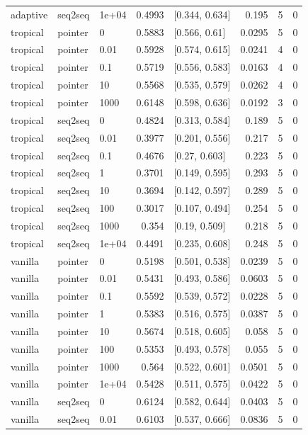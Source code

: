 \documentclass[10pt]{article}
\begin{document}
{\begin{longtable}{lllrlrrr}
adaptive & seq2seq & 1e+04 & 0.4993 & [0.344, 0.634] & 0.195 & 5 & 0\\
tropical & pointer & 0 & 0.5883 & [0.566, 0.61] & 0.0295 & 5 & 0\\
tropical & pointer & 0.01 & 0.5928 & [0.574, 0.615] & 0.0241 & 4 & 0\\
tropical & pointer & 0.1 & 0.5719 & [0.556, 0.583] & 0.0163 & 4 & 0\\
tropical & pointer & 10 & 0.5568 & [0.535, 0.579] & 0.0262 & 4 & 0\\
tropical & pointer & 1000 & 0.6148 & [0.598, 0.636] & 0.0192 & 3 & 0\\
tropical & seq2seq & 0 & 0.4824 & [0.313, 0.584] & 0.189 & 5 & 0\\
tropical & seq2seq & 0.01 & 0.3977 & [0.201, 0.556] & 0.217 & 5 & 0\\
tropical & seq2seq & 0.1 & 0.4676 & [0.27, 0.603] & 0.223 & 5 & 0\\
tropical & seq2seq & 1 & 0.3701 & [0.149, 0.595] & 0.293 & 5 & 0\\
tropical & seq2seq & 10 & 0.3694 & [0.142, 0.597] & 0.289 & 5 & 0\\
tropical & seq2seq & 100 & 0.3017 & [0.107, 0.494] & 0.254 & 5 & 0\\
tropical & seq2seq & 1000 & 0.354 & [0.19, 0.509] & 0.218 & 5 & 0\\
tropical & seq2seq & 1e+04 & 0.4491 & [0.235, 0.608] & 0.248 & 5 & 0\\
vanilla & pointer & 0 & 0.5198 & [0.501, 0.538] & 0.0239 & 5 & 0\\
vanilla & pointer & 0.01 & 0.5431 & [0.493, 0.586] & 0.0603 & 5 & 0\\
vanilla & pointer & 0.1 & 0.5592 & [0.539, 0.572] & 0.0228 & 5 & 0\\
vanilla & pointer & 1 & 0.5383 & [0.516, 0.575] & 0.0387 & 5 & 0\\
vanilla & pointer & 10 & 0.5674 & [0.518, 0.605] & 0.058 & 5 & 0\\
vanilla & pointer & 100 & 0.5353 & [0.493, 0.578] & 0.055 & 5 & 0\\
vanilla & pointer & 1000 & 0.564 & [0.522, 0.601] & 0.0501 & 5 & 0\\
vanilla & pointer & 1e+04 & 0.5428 & [0.511, 0.575] & 0.0422 & 5 & 0\\
vanilla & seq2seq & 0 & 0.6124 & [0.582, 0.644] & 0.0403 & 5 & 0\\
vanilla & seq2seq & 0.01 & 0.6103 & [0.537, 0.666] & 0.0836 & 5 & 0\\

\end{longtable}}
\end{document}
